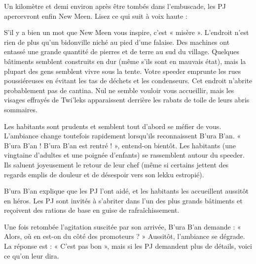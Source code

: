 \documentclass[a4paper,10pt,twoside,twocolumn,openany]{book}
\begin{document}
Un kilomètre et demi environ après être tombés dans
l’embuscade, les PJ apercevront enfin New Meen. Lisez
ce qui suit à voix haute :
\begin{quotebox}

S’il y a bien un mot que New Meen vous inspire,
c’est « misère ». L’endroit n’est rien de plus qu’un
bidonville niché au pied d’une falaise. Des machines ont entassé une grande quantité de pierres
et de terre au sud du village. Quelques bâtiments
semblent construits en dur (même s’ils sont en
mauvais état), mais la plupart des gens semblent
vivre sous la tente. Votre speeder emprunte les rues
poussiéreuses en évitant les tas de déchets et les
condenseurs. Cet endroit n’abrite probablement
pas de cantina. Nul ne semble vouloir vous accueillir, mais les visages effrayés de Twi’leks apparaissent
derrière les rabats de toile de leurs abris sommaires.



Les habitants sont prudents et semblent tout
d’abord se méfier de vous. L’ambiance change
toutefois rapidement lorsqu’ils reconnaissent
B’ura B’an. « B’ura B’an ! B’ura B’an est rentré ! »,
entend-on bientôt. Les habitants (une vingtaine
d’adultes et une poignée d’enfants) se rassemblent
autour du speeder. Ils saluent joyeusement le retour de leur chef (même si certains jettent des regards emplis de douleur et de désespoir vers son
lekku estropié).
\end{quotebox}

B’ura B’an explique que les PJ l’ont aidé, et les habitants les accueillent aussitôt en héros. Les PJ sont invités
à s’abriter dans l’un des plus grands bâtiments et reçoivent des rations de base en guise de rafraîchissement.

\subtitle{L’HISTOIRE D’ANGU DROMBB
ET DES PROMOTEURS}

Une fois retombée l’agitation suscitée par son arrivée,
B’ura B’an demande : « Alors, où en est-on du côté des
promoteurs ? » Aussitôt, l’ambiance se dégrade. La réponse est : « C’est pas bon », mais si les PJ demandent
plus de détails, voici ce qu’on leur dira.
\end{document}
